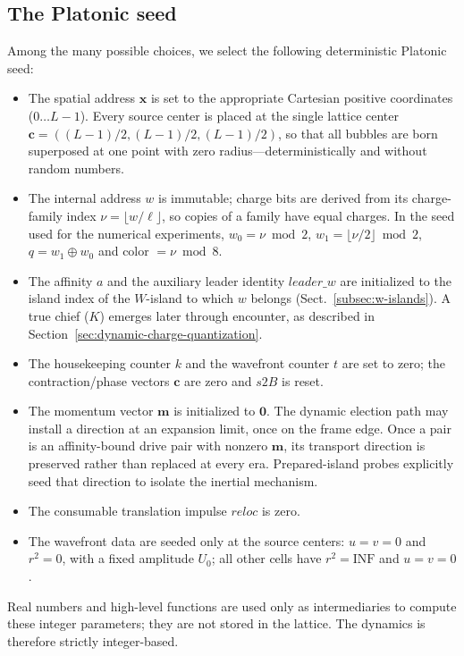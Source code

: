 \documentclass{ijuc}
\begin{document}
\subsection{The Platonic seed}
Among the many possible choices, we select the following deterministic Platonic seed:
\begin{itemize}
\item The spatial address $\boldsymbol{x}$ is set to the appropriate Cartesian positive coordinates ($0\ldots L-1$).  Every source center is placed at the single lattice center $\mathbf{c}=((L-1)/2,(L-1)/2,(L-1)/2)$, so that all bubbles are born superposed at one point with zero radius---deterministically and without random numbers.
\item The internal address $w$ is immutable; charge bits are derived from its charge-family index $\nu=\lfloor w/\ell\rfloor$, so copies of a family have equal charges. In the seed used for the numerical experiments, $w_0=\nu\bmod2$, $w_1=\lfloor\nu/2\rfloor\bmod2$, $q=w_1\oplus w_0$ and color $=\nu\bmod8$.
\item The affinity $a$ and the auxiliary leader identity $\mathit{leader\_w}$ are initialized to the island index of the $W$-island to which $w$ belongs (Sect.~\ref{subsec:w-islands}).  A true chief ($K$) emerges later through encounter, as described in Section~\ref{sec:dynamic-charge-quantization}.
\item The housekeeping counter $k$ and the wavefront counter $t$ are set to zero; the contraction/phase vectors $\mathbf{c}$ are zero and $s2B$ is reset.
\item The momentum vector $\boldsymbol{m}$ is initialized to $\boldsymbol{0}$. The dynamic election path may install a direction at an expansion limit, once on the frame edge. Once a pair is an affinity-bound drive pair with nonzero $\boldsymbol{m}$, its transport direction is preserved rather than replaced at every era. Prepared-island probes explicitly seed that direction to isolate the inertial mechanism.
\item The consumable translation impulse $\mathit{reloc}$ is zero.
\item The wavefront data are seeded only at the source centers: $u=v=0$ and $r^{2}=0$, with a fixed amplitude $U_{0}$; all other cells have $r^{2}=\mathrm{INF}$ and $u=v=0$.
\end{itemize}
Real numbers and high-level functions are used only as intermediaries to compute these integer parameters; they are not stored in the lattice.  The dynamics is therefore strictly integer-based.
\end{document}
